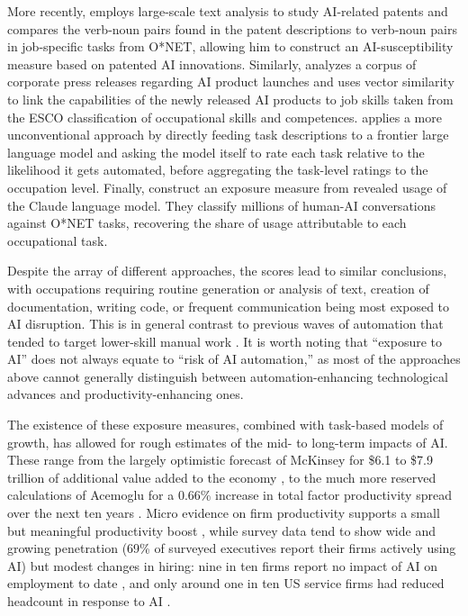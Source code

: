 \documentclass[11pt]{article}
\begin{document}
More recently, \citet{webb_impact_2022} employs large-scale text analysis to study AI-related patents and compares the verb-noun pairs found in the patent descriptions to verb-noun pairs in job-specific tasks from O*NET, allowing him to construct an AI-susceptibility measure based on patented AI innovations. Similarly, \citet{demirev2024assessing} analyzes a corpus of corporate press releases regarding AI product launches and uses vector similarity to link the capabilities of the newly released AI products to job skills taken from the ESCO classification of occupational skills and competences. \citet{eloundou_gpts_2023} applies a more unconventional approach by directly feeding task descriptions to a frontier large language model and asking the model itself to rate each task relative to the likelihood it gets automated, before aggregating the task-level ratings to the occupation level. Finally, \citet{handa2025economic} construct an exposure measure from revealed usage of the Claude language model. They classify millions of human-AI conversations against O*NET tasks, recovering the share of usage attributable to each occupational task.

Despite the array of different approaches, the scores lead to similar conclusions, with occupations requiring routine generation or analysis of text, creation of documentation, writing code, or frequent communication being most exposed to AI disruption. This is in general contrast to previous waves of automation that tended to target lower-skill manual work \citep{acemoglu2023power}. It is worth noting that ``exposure to AI'' does not always equate to ``risk of AI automation,'' as most of the approaches above cannot generally distinguish between automation-enhancing technological advances and productivity-enhancing ones.

The existence of these exposure measures, combined with task-based models of growth, has allowed for rough estimates of the mid- to long-term impacts of AI. These range from the largely optimistic forecast of McKinsey for \$6.1 to \$7.9 trillion of additional value added to the economy \citep{mckinsey2023economic}, to the much more reserved calculations of Acemoglu for a 0.66\% increase in total factor productivity spread over the next ten years \citep{acemoglu2024simple}. Micro evidence on firm productivity supports a small but meaningful productivity boost \citep{brynjolfsson2025genai}, while survey data tend to show wide and growing penetration (69\% of surveyed executives report their firms actively using AI) but modest changes in hiring: nine in ten firms report no impact of AI on employment to date \citep{yotzov2026firmdata}, and only around one in ten US service firms had reduced headcount in response to AI \citep{nyfedsurvey2024}.
\end{document}
